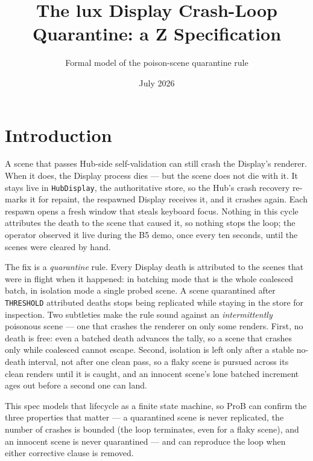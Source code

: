 \documentclass[a4paper,10pt,fleqn]{article}
\begin{document}
\title{The lux Display Crash-Loop Quarantine: a Z Specification}
\author{Formal model of the poison-scene quarantine rule}
\date{July 2026}
\maketitle

\section{Introduction}

A scene that passes Hub-side self-validation can still crash the Display's
renderer.  When it does, the Display process dies --- but the scene does not
die with it.  It stays live in \texttt{HubDisplay}, the authoritative store, so
the Hub's crash recovery re-marks it for repaint, the respawned Display receives
it, and it crashes again.  Each respawn opens a fresh window that steals
keyboard focus.  Nothing in this cycle attributes the death to the scene that
caused it, so nothing stops the loop; the operator observed it live during the
B5 demo, once every ten seconds, until the scenes were cleared by hand.

The fix is a \emph{quarantine} rule.  Every Display death is attributed to the
scenes that were in flight when it happened: in batching mode that is the whole
coalesced batch, in isolation mode a single probed scene.  A scene quarantined
after \texttt{THRESHOLD} attributed deaths stops being replicated while staying
in the store for inspection.  Two subtleties make the rule sound against an
\emph{intermittently} poisonous scene --- one that crashes the renderer on only
some renders.  First, no death is free: even a batched death advances the tally,
so a scene that crashes only while coalesced cannot escape.  Second, isolation is
left only after a stable no-death interval, not after one clean pass, so a flaky
scene is pursued across its clean renders until it is caught, and an innocent
scene's lone batched increment ages out before a second one can land.

This spec models that lifecycle as a finite state machine, so ProB can confirm
the three properties that matter --- a quarantined scene is never replicated, the
number of crashes is bounded (the loop terminates, even for a flaky scene), and
an innocent scene is never quarantined --- and can reproduce the loop when either
corrective clause is removed.
\end{document}
